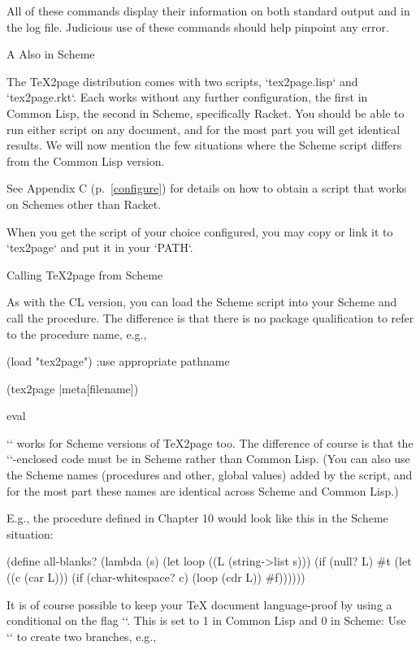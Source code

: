 {{{{{{{{{All of these commands display their information
on both standard output and in the log file.
Judicious use of these commands
should help pinpoint any error.

\beginchapter A Also in Scheme

The \TeX2page distribution comes with two scripts,
`tex2page.lisp` and `tex2page.rkt`. Each works without any
further configuration, the first in Common Lisp, the second in
Scheme, specifically Racket.
You should be able to run either script on any document, and for
the most part you will get identical results. We will now mention
the few situations where the Scheme script differs from the
Common Lisp version.

See Appendix C (p.~\ref{configure}) for details on how to obtain a script that works
on Schemes other than Racket.

When you get the script of your choice configured, you may copy or link it to
`tex2page` and put it in your `PATH`.

\beginsection Calling \TeX2page from Scheme

%
As with the CL version, you can load the Scheme script into your
Scheme and call the  procedure. The difference is
that there is no package qualification to refer to the procedure
name, e.g.,

\begintts
(load "tex2page") ;use appropriate pathname

(tex2page |meta[filename])
\endtt

\beginsection  eval

`\eval` works for Scheme versions of \TeX2page too. The
difference of course is that the `\eval`-enclosed code must be in
Scheme rather than Common Lisp. (You can also use the
Scheme names (procedures and other, global values) added by the
script, and for the most part these names are identical across
Scheme and Common Lisp.)

E.g., the  procedure
defined in Chapter 10 would look like this in the Scheme
situation:

\begintts
(define all-blanks?
  (lambda (s)
    (let loop ((L (string->list s)))
      (if (null? L) #t
          (let ((c (car L)))
            (if (char-whitespace? c) (loop (cdr L))
                #f))))))
\endtt

It is of course possible to keep your TeX document
language-proof by using a conditional on the flag
`\TZPcommonlisp`. This is set to 1 in Common Lisp and 0 in Scheme:
Use `\ifx` to create two branches, e.g.,

}}}}}}}}}
